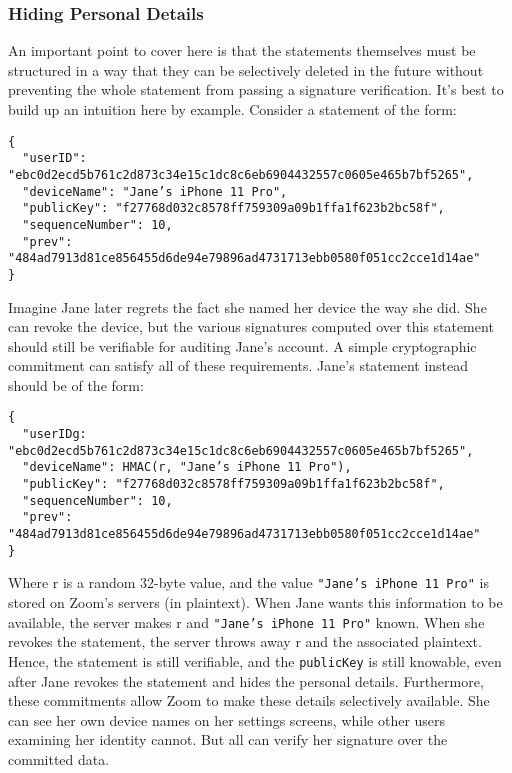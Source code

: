 \subsubsection{Hiding Personal Details}

An important point to cover here is that the statements themselves must be structured in a way that they can be selectively deleted in the future without preventing the whole statement from passing a signature verification. It's best to build up an intuition here by example. Consider a statement of the form:

\begingroup{}
\fontsize{10pt}{12pt}\selectfont{}
\begin{verbatim}
{
  "userID": "ebc0d2ecd5b761c2d873c34e15c1dc8c6eb6904432557c0605e465b7bf5265",
  "deviceName": "Jane’s iPhone 11 Pro",
  "publicKey": "f27768d032c8578ff759309a09b1ffa1f623b2bc58f",
  "sequenceNumber": 10,
  "prev": "484ad7913d81ce856455d6de94e79896ad4731713ebb0580f051cc2cce1d14ae"
}
\end{verbatim}
\endgroup{}

Imagine Jane later regrets the fact she named her device the way she did. She can revoke the device, but the various signatures computed over this statement should still be verifiable for auditing Jane's account. A simple cryptographic commitment can satisfy all of these requirements. Jane's statement instead should be of the form:

\begingroup{}
\fontsize{10pt}{12pt}\selectfont{}
\begin{verbatim}
{
  "userIDg: "ebc0d2ecd5b761c2d873c34e15c1dc8c6eb6904432557c0605e465b7bf5265",
  "deviceName": HMAC(r, "Jane’s iPhone 11 Pro"),
  "publicKey": "f27768d032c8578ff759309a09b1ffa1f623b2bc58f",
  "sequenceNumber": 10,
  "prev": "484ad7913d81ce856455d6de94e79896ad4731713ebb0580f051cc2cce1d14ae"
}
\end{verbatim}
\endgroup{}

Where $\mathrm{r}$ is a random 32-byte value, and the value \texttt{"Jane’s iPhone 11 Pro"} is stored on Zoom's servers (in plaintext). When Jane wants this information to be available, the server makes $\mathrm{r}$ and \texttt{"Jane’s iPhone 11 Pro"} known. When she revokes the statement, the server throws away $\mathrm{r}$ and the associated plaintext. Hence, the statement is still verifiable, and the \texttt{publicKey} is still knowable, even after Jane revokes the statement and hides the personal details. Furthermore, these commitments allow Zoom to make these details selectively available. She can see her own device names on her settings screens, while other users examining her identity cannot. But all can verify her signature over the committed data.

